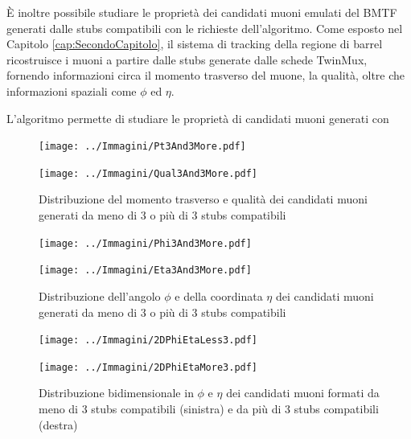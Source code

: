 È inoltre possibile studiare le proprietà dei candidati muoni emulati del BMTF generati dalle stubs compatibili con le richieste dell'algoritmo. Come esposto nel Capitolo \ref{cap:SecondoCapitolo}, il sistema di tracking della regione di barrel ricostruisce i muoni a partire dalle stubs generate dalle schede TwinMux, fornendo informazioni circa il momento trasverso del muone, la qualità, oltre che informazioni spaziali come $\phi$ ed $\eta$. 


L'algoritmo permette di studiare le proprietà di candidati muoni generati con 





\begin{figure}[t]
  \centering
  \begin{minipage}[b]{0.48\textwidth}
    \centering
    \texttt{[image: ../Immagini/Pt3And3More.pdf]} 
    \end{minipage}
    \hfill 
    \begin{minipage}[b]{0.48\textwidth}
      \centering
      \texttt{[image: ../Immagini/Qual3And3More.pdf]} 
    \end{minipage}
    \caption{Distribuzione del momento trasverso e qualità dei candidati muoni generati da meno di 3 o più di 3 stubs compatibili}
  \label{fig:PtQual3And3More}
\end{figure}

\begin{figure}[b]
  \centering
  \begin{minipage}[b]{0.48\textwidth}
    \centering
    \texttt{[image: ../Immagini/Phi3And3More.pdf]} 
    \end{minipage}
    \hfill 
    \begin{minipage}[b]{0.48\textwidth}
      \centering
      \texttt{[image: ../Immagini/Eta3And3More.pdf]} 
    \end{minipage}
    \caption{Distribuzione dell'angolo $\phi$ e della coordinata $\eta$ dei candidati muoni generati da meno di 3 o più di 3 stubs compatibili}
  \label{fig:PhiEta3And3More}
\end{figure}



\begin{figure}[t]
  \centering
  \begin{minipage}[b]{0.49\textwidth}
    \centering
    \texttt{[image: ../Immagini/2DPhiEtaLess3.pdf]} 
    \end{minipage}
    \hfill 
    \begin{minipage}[b]{0.49\textwidth}
      \centering
      \texttt{[image: ../Immagini/2DPhiEtaMore3.pdf]} 
    \end{minipage}
    \caption{Distribuzione bidimensionale in $\phi$ e $\eta$ dei candidati muoni formati da meno di 3 stubs compatibili (sinistra) e da più di 3 stubs compatibili (destra)}
  \label{fig:2DPhiEtaLess3AndMore3} 
\end{figure}
